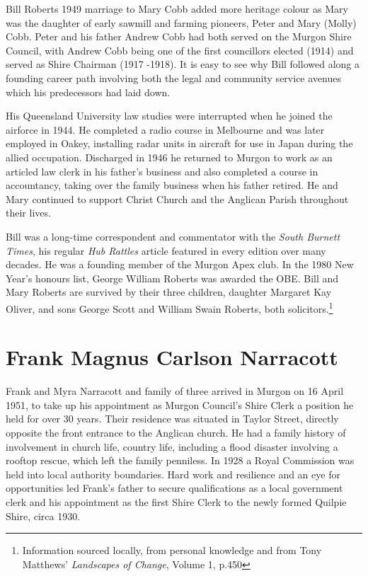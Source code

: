 Bill Roberts 1949 marriage to Mary Cobb added more heritage colour as Mary was the daughter of early sawmill and farming pioneers, Peter and Mary (Molly) Cobb. Peter and his father Andrew Cobb had both served on the Murgon Shire Council, with Andrew Cobb being one of the first councillors elected (1914) and served as Shire Chairman (1917 -1918). It is easy to see why Bill followed along a founding career path involving both the legal and community service avenues which his predecessors had laid down.



His Queensland University law studies were interrupted when he joined the airforce in 1944. He completed a radio course in Melbourne and was later employed in Oakey, installing radar units in aircraft for use in Japan during the allied occupation. Discharged in 1946 he returned to Murgon to work as an articled law clerk in his father's business and also completed a course in accountancy, taking over the family business when his father retired. He and Mary continued to support Christ Church and the Anglican Parish throughout their lives.



Bill was a long-time correspondent and commentator with the \emph{South Burnett Times}, his regular \emph{Hub Rattles} article featured in every edition over many decades. He was a founding member of the Murgon Apex club. In the 1980 New Year's honours list, George William Roberts was awarded the OBE. Bill and Mary Roberts are survived by their three children, daughter Margaret Kay Oliver, and sons George Scott and William Swain Roberts, both solicitors.\footnote{Information sourced locally, from personal knowledge and from Tony Matthews' \emph{Landscapes of Change}, Volume 1, p.450}


\section{Frank Magnus Carlson Narracott}



Frank and Myra Narracott and family of three arrived in Murgon on 16 April 1951, to take up his appointment as Murgon Council's Shire Clerk a position he held for over 30 years. Their residence was situated in Taylor Street, directly opposite the front entrance to the Anglican church. He had a family history of involvement in church life, country life, including a flood disaster involving a rooftop rescue, which left the family penniless. In 1928 a Royal Commission was held into local authority boundaries. Hard work and resilience and an eye for opportunities led Frank's father to secure qualifications as a local government clerk and his appointment as the first Shire Clerk to the newly formed Quilpie Shire, circa 1930.



